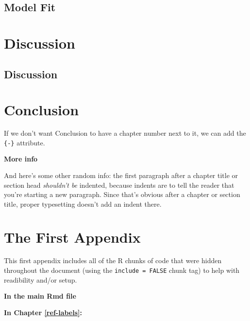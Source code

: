 \documentclass[12pt,twoside]{reedthesis}
\theoremstyle{definition}
\theoremstyle{definition}
\theoremstyle{definition}
\theoremstyle{remark}
\begin{document}
\section{Model Fit}\label{model-fit-1}

\chapter{Discussion}\label{discussion}

\section{Discussion}\label{discussion-1}

\chapter*{Conclusion}\label{conclusion}

If we don't want Conclusion to have a chapter number next to it, we can
add the \texttt{\{-\}} attribute.

\textbf{More info}

And here's some other random info: the first paragraph after a chapter
title or section head \emph{shouldn't be} indented, because indents are
to tell the reader that you're starting a new paragraph. Since that's
obvious after a chapter or section title, proper typesetting doesn't add
an indent there.

\appendix

\chapter{The First Appendix}\label{the-first-appendix}

This first appendix includes all of the R chunks of code that were
hidden throughout the document (using the \texttt{include\ =\ FALSE}
chunk tag) to help with readibility and/or setup.

\textbf{In the main Rmd file}
\begin{Shaded}
\begin{Highlighting}[]
\NormalTok{(}\OperatorTok{!}
  \NormalTok{(}\NormalTok{, } \NormalTok{)}
\NormalTok{(}\OperatorTok{!}
\OperatorTok{::}\NormalTok{(}\NormalTok{)}
\end{Highlighting}
\end{Shaded}
\textbf{In Chapter \ref{ref-labels}:}
\end{document}
